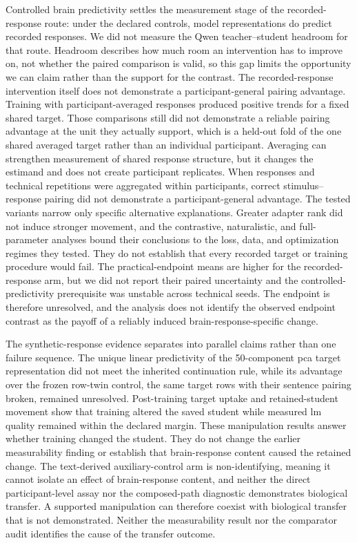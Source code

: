 Controlled brain predictivity settles the measurement stage of the recorded-response route: under the declared controls, model representations do predict recorded responses.
We did not measure the Qwen teacher--student headroom for that route.
Headroom describes how much room an intervention has to improve on, not whether the paired comparison is valid, so this gap limits the opportunity we can claim rather than the support for the contrast.
The recorded-response intervention itself does not demonstrate a participant-general pairing advantage.
Training with participant-averaged responses produced positive trends for a fixed shared target.
Those comparisons still did not demonstrate a reliable pairing advantage at the unit they actually support, which is a held-out fold of the one shared averaged target rather than an individual participant.
Averaging can strengthen measurement of shared response structure, but it changes the estimand and does not create participant replicates.
When responses and technical repetitions were aggregated within participants, correct stimulus--response pairing did not demonstrate a participant-general advantage.
The tested variants narrow only specific alternative explanations.
Greater adapter rank did not induce stronger movement, and the contrastive, naturalistic, and full-parameter analyses bound their conclusions to the loss, data, and optimization regimes they tested.
They do not establish that every recorded target or training procedure would fail.
The practical-endpoint means are higher for the recorded-response arm, but we did not report their paired uncertainty and the controlled-predictivity prerequisite was unstable across technical seeds.
The endpoint is therefore unresolved, and the analysis does not identify the observed endpoint contrast as the payoff of a reliably induced brain-response-specific change.

The synthetic-response evidence separates into parallel claims rather than one failure sequence.
The unique linear predictivity of the 50-component \ac{pca} target representation did not meet the inherited continuation rule, while its advantage over the frozen row-twin control, the same target rows with their sentence pairing broken, remained unresolved.
Post-training target uptake and retained-student movement show that training altered the saved student while measured \ac{lm} quality remained within the declared margin.
These manipulation results answer whether training changed the student.
They do not change the earlier measurability finding or establish that brain-response content caused the retained change.
The text-derived auxiliary-control arm is non-identifying, meaning it cannot isolate an effect of brain-response content, and neither the direct participant-level assay nor the composed-path diagnostic demonstrates biological transfer.
A supported manipulation can therefore coexist with biological transfer that is not demonstrated.
Neither the measurability result nor the comparator audit identifies the cause of the transfer outcome.


